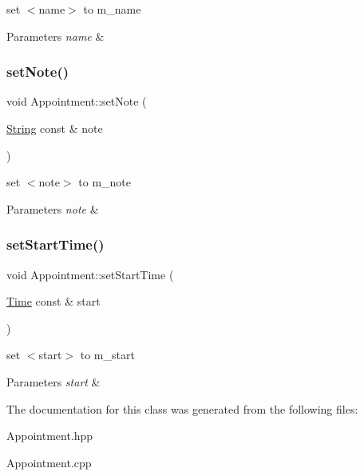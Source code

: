 set $<$name$>$ to m\+\_\+name 
\begin{DoxyParams}{Parameters}
{\em name} & \\
\hline
\end{DoxyParams}
\mbox{\label{classAppointment_a367bc61167a71691ba150808968f3b8c}} 
\subsubsection{\texorpdfstring{set\+Note()}{setNote()}}
{\footnotesize\ttfamily void Appointment\+::set\+Note (\begin{DoxyParamCaption}\item[{\hyperlink{classString}{String} const \&}]{note }\end{DoxyParamCaption})}

set $<$note$>$ to m\+\_\+note 
\begin{DoxyParams}{Parameters}
{\em note} & \\
\hline
\end{DoxyParams}
\mbox{\label{classAppointment_ae0e33915a3e3d3af95c7e6180809e5fe}} 
\subsubsection{\texorpdfstring{set\+Start\+Time()}{setStartTime()}}
{\footnotesize\ttfamily void Appointment\+::set\+Start\+Time (\begin{DoxyParamCaption}\item[{\hyperlink{classTime}{Time} const \&}]{start }\end{DoxyParamCaption})}

set $<$start$>$ to m\+\_\+start 
\begin{DoxyParams}{Parameters}
{\em start} & \\
\hline
\end{DoxyParams}


The documentation for this class was generated from the following files\+:\begin{DoxyCompactItemize}
\item 
Appointment.\+hpp\item 
Appointment.\+cpp\end{DoxyCompactItemize}

